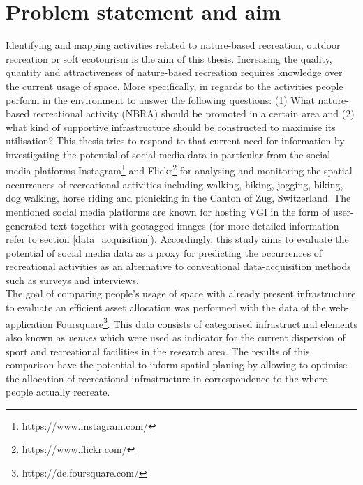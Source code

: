 \section{Problem statement and aim}
Identifying and mapping activities related to nature-based recreation, outdoor recreation or soft ecotourism is the aim of this thesis.
Increasing the quality, quantity and attractiveness of nature-based recreation requires knowledge over the current usage of space. More specifically, in regards to the activities people perform in the environment to answer the following questions: (1) What nature-based recreational activity (NBRA) should be promoted in a certain area and (2) what kind of supportive infrastructure should be constructed to maximise its utilisation? This thesis tries to respond to that current need for information by investigating the potential of social media data in particular from the social media platforms Instagram\footnote{https://www.instagram.com/} and Flickr\footnote{https://www.flickr.com/} for analysing and monitoring the spatial occurrences of recreational activities including walking, hiking, jogging, biking, dog walking, horse riding and picnicking in the Canton of Zug, Switzerland. The mentioned social media platforms are known for hosting VGI in the form of user-generated text together with geotagged images (for more detailed information refer to section \ref{data_acquisition}). Accordingly, this study aims to evaluate the potential of social media data as a proxy for predicting the occurrences of recreational activities as an alternative to conventional data-acquisition methods such as surveys and interviews.\\
The goal of comparing people's usage of space with already present infrastructure to evaluate an efficient asset allocation was performed with the data of the web-application Foursquare\footnote{https://de.foursquare.com/}. This data consists of categorised infrastructural elements also known as \textit{venues} which were used as indicator for the current dispersion of sport and recreational facilities in the research area. The results of this comparison have the potential to inform spatial planing by allowing to optimise the allocation of recreational infrastructure in correspondence to the where people actually recreate.

